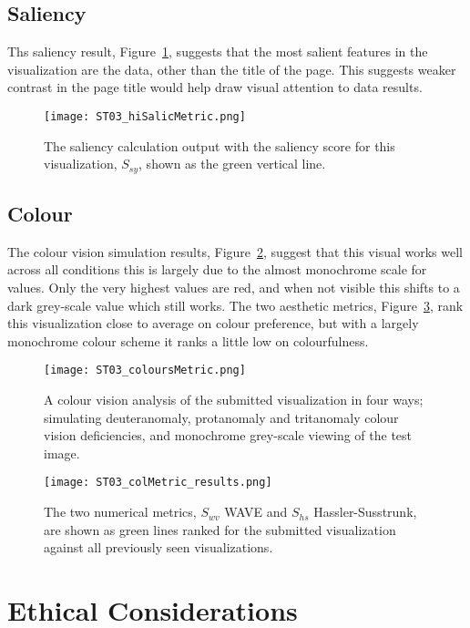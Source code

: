 \subsection{Saliency}
Ths saliency result, Figure~\ref{fig:ST03salicResults}, suggests that the most salient features in the visualization are the data, other than the title of the page. This suggests weaker contrast in the page title would help draw visual attention to data results.
\begin{figure}[htb]
  \centering
  \texttt{[image: ST03\_hiSalicMetric.png]}
  \caption{\label{fig:ST03salicResults}
           The saliency calculation output with the saliency score for this visualization, $S_{sy}$, shown as the green vertical line.}
\end{figure}

\subsection{Colour}
The colour vision simulation results, Figure~\ref{fig:colResults03}, suggest that this visual works well across all conditions this is largely due to the almost monochrome scale for values. Only the very highest values are red, and when not visible this shifts to a dark grey-scale value which still works. The two aesthetic metrics, Figure~\ref{fig:colMetricResults03}, rank this visualization close to average on colour preference, but with a largely monochrome colour scheme it ranks a little low on colourfulness.
\begin{figure}[htb]
  \centering
  \texttt{[image: ST03\_coloursMetric.png]}
  \caption{\label{fig:colResults03}
           A colour vision analysis of the submitted visualization in four ways; simulating deuteranomaly, protanomaly and tritanomaly colour vision deficiencies, and monochrome grey-scale viewing of the test image.}
\end{figure}

\begin{figure}[htb]
  \centering
  \texttt{[image: ST03\_colMetric\_results.png]}
  \caption{\label{fig:colMetricResults03}
           The two numerical metrics, $S_{wv}$ WAVE and $S_{hs}$ Hassler-Susstrunk, are shown as green lines ranked for the submitted visualization against all previously seen visualizations.}
\end{figure}

\section{Ethical Considerations}


